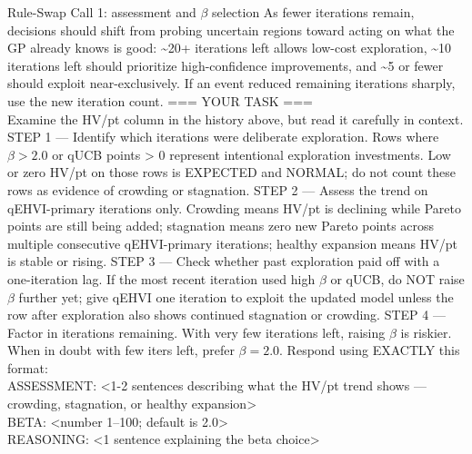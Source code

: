 \begin{fragmentbox}{Rule-Swap Call 1: assessment and $\beta$ selection}
As fewer iterations remain, decisions should shift from probing uncertain regions
toward acting on what the GP already knows is good: \~{}20+ iterations left allows
low-cost exploration, \~{}10 iterations left should prioritize high-confidence
improvements, and \~{}5 or fewer should exploit near-exclusively. If an event reduced
remaining iterations sharply, use the new iteration count.
\vspace{0.35em}
=== YOUR TASK ===\\
Examine the HV/pt column in the history above, but read it carefully in context.
\vspace{0.35em}
STEP 1 --- Identify which iterations were deliberate exploration. Rows where $\beta >
2.0$ or qUCB points > 0 represent intentional exploration investments. Low or zero
HV/pt on those rows is EXPECTED and NORMAL; do not count these rows as evidence of
crowding or stagnation.
\vspace{0.35em}
STEP 2 --- Assess the trend on qEHVI-primary iterations only. Crowding means HV/pt is
declining while Pareto points are still being added; stagnation means zero new Pareto
points across multiple consecutive qEHVI-primary iterations; healthy expansion means
HV/pt is stable or rising.
\vspace{0.35em}
STEP 3 --- Check whether past exploration paid off with a one-iteration lag. If the
most recent iteration used high $\beta$ or qUCB, do NOT raise $\beta$ further yet; give
qEHVI one iteration to exploit the updated model unless the row after exploration also
shows continued stagnation or crowding.
\vspace{0.35em}
STEP 4 --- Factor in iterations remaining. With very few iterations left, raising
$\beta$ is riskier. When in doubt with few iters left, prefer $\beta = 2.0$.
\vspace{0.35em}
Respond using EXACTLY this format:\\
ASSESSMENT: <1-2 sentences describing what the HV/pt trend shows --- crowding, stagnation, or healthy expansion>\\
BETA: <number 1--100; default is 2.0>\\
REASONING: <1 sentence explaining the beta choice>
\end{fragmentbox}

